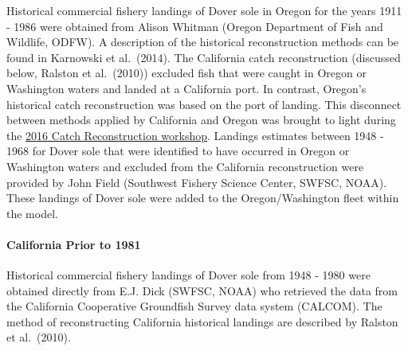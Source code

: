 \documentclass[11pt,
  english,
  a4paper,
]{article}
\begin{document}
Historical commercial fishery landings of Dover sole in Oregon for the years 1911 - 1986 were obtained from Alison Whitman (Oregon Department of Fish and Wildlife, ODFW). A description of the historical reconstruction methods can be found in Karnowski et al.~{(2014)\leavevmode\tagmcend\tagstructend}. The California catch reconstruction (discussed below, Ralston et al.~{(2010)\leavevmode\tagmcend\tagstructend}) excluded fish that were caught in Oregon or Washington waters and landed at a California port. In contrast, Oregon's historical catch reconstruction was based on the port of landing. This disconnect between methods applied by California and Oregon was brought to light during the {\href{https://www.pcouncil.org/documents/2017/03/i2_att1_catch_reconstruction_workshop_report_mar2017bb.pdf/}{2016 Catch Reconstruction workshop}\leavevmode\tagmcend\tagstructend}. Landings estimates between 1948 - 1968 for Dover sole that were identified to have occurred in Oregon or Washington waters and excluded from the California reconstruction were provided by John Field (Southwest Fishery Science Center, SWFSC, NOAA). These landings of Dover sole were added to the Oregon/Washington fleet within the model.

\leavevmode\tagmcend\tagstructend\par


\hypertarget{california-prior-to-1981}{%
\paragraph{California Prior to 1981}\label{california-prior-to-1981}}

\leavevmode\tagmcend\tagstructend


Historical commercial fishery landings of Dover sole from 1948 - 1980 were obtained directly from E.J. Dick (SWFSC, NOAA) who retrieved the data from the California Cooperative Groundfish Survey data system (CALCOM). The method of reconstructing California historical landings are described by Ralston et al.~{(2010)\leavevmode\tagmcend\tagstructend}.

\leavevmode\tagmcend\tagstructend\par
\end{document}
